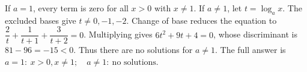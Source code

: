 If $a=1$, every term is zero for all $x>0$ with $x\ne1$. If $a\ne1$, let $t=\log_ax$. The excluded bases give $t\ne0,-1,-2$. Change of base reduces the equation to $\dfrac{2}{t}+\dfrac{1}{t+1}+\dfrac{3}{t+2}=0$. Multiplying gives $6t^2+9t+4=0$, whose discriminant is $81-96=-15<0$. Thus there are no solutions for $a\ne1$. The full answer is $\boxed{a=1:\ x>0,x\ne1;\quad a\ne1:\ \text{no solutions}}$.
